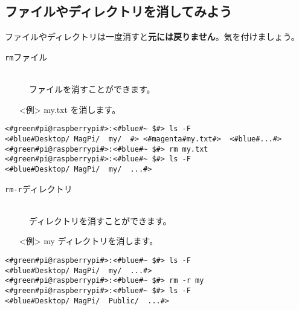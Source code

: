 \subsection{ファイルやディレクトリを消してみよう}
ファイルやディレクトリは一度消すと\textbf{元には戻りません}。気を付けましょう。
\begin{description}
\item[\texttt{rm}\textvisiblespace ファイル]\mbox{}\\
ファイルを消すことができます。
\end{description}
\begin{itemize}
\item[<例>]my.txt を消します。
\end{itemize}
\begin{lstlisting}[caption=cpの例, label=cp]
<#green#pi@raspberrypi#>:<#blue#~ $#> ls -F
<#blue#Desktop/	MagPi/	my/	 #>	<#magenta#my.txt#>	<#blue#...#>
<#green#pi@raspberrypi#>:<#blue#~ $#> rm my.txt
<#green#pi@raspberrypi#>:<#blue#~ $#> ls -F
<#blue#Desktop/	MagPi/	my/	 ...#>
\end{lstlisting}
\begin{description}
\item[\texttt{rm}\textvisiblespace \texttt{-r}\textvisiblespace ディレクトリ]\mbox{}\\
ディレクトリを消すことができます。
\end{description}
\begin{itemize}
\item[<例>]my ディレクトリを消します。
\end{itemize}
\begin{lstlisting}[caption=cp -rの例, label=cp-R]
<#green#pi@raspberrypi#>:<#blue#~ $#> ls -F
<#blue#Desktop/	MagPi/	my/	 ...#>
<#green#pi@raspberrypi#>:<#blue#~ $#> rm -r my
<#green#pi@raspberrypi#>:<#blue#~ $#> ls -F
<#blue#Desktop/	MagPi/	Public/	 ...#>
\end{lstlisting}
\begin{tcolorbox}[title=\useOmetoi]
\begin{enumerate}
\end{enumerate}
\end{tcolorbox}
